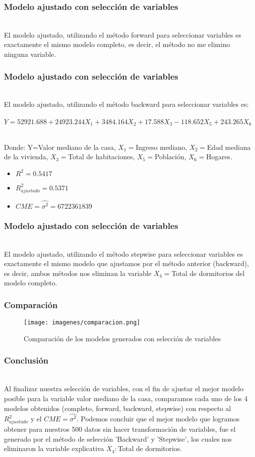 \documentclass[12pt]{beamer}
\begin{document}
\begin{frame}
\frametitle{Modelo ajustado con selección de variables}
~\\ El modelo ajustado, utilizando el método forward para seleccionar variables es exactamente el mismo modelo completo, es decir, el método no me elimino ninguna variable.
\end{frame}

\begin{frame}
\frametitle{Modelo ajustado con selección de variables}
~\\ El modelo ajustado, utilizando el método backward para seleccionar variables es:
~\\ $Y=52921.688+24923.244X_{1}+3484.164X_{2}+17.588X_{3}-118.652X_{5}+243.265X_{6}$

~\\ Donde: Y=Valor mediano de la casa, $X_{1}=$Ingreso mediano, $X_{2}=$Edad mediana de la vivienda, $X_{3}=$Total de habitaciones, $X_{5}=$Población, $X_{6}=$Hogares.
\begin{itemize}
\item $R^2=0.5417$
\item $R^2_{ajustado}=0.5371$
\item $CME=\hat{\sigma^2}=6722361839$
\end{itemize}
\end{frame}

\begin{frame}
\frametitle{Modelo ajustado con selección de variables}
~\\ El modelo ajustado, utilizando el método stepwise para seleccionar variables es  exactamente el mismo modelo que ajustamos por el método anterior (backward), es decir, ambos métodos nos eliminan la variable $X_{4}=$Total de dormitorios del modelo completo.
\end{frame}

\begin{frame}
\frametitle{Comparación}
\begin{figure}[!h]
    \begin{center}
        \texttt{[image: imagenes/comparacion.png]}
        \caption{Comparación de los modelos generados con selección de variables}
        \label{fig:Densidad}
    \end{center}
\end{figure}
\end{frame}

\begin{frame}
\frametitle{Conclusión}
~\\ Al finalizar nuestra selección de variables, con el fin de ajustar el mejor modelo posible para la variable valor mediano de la casa, comparamos cada uno de los 4 modelos obtenidos (completo, forward, backward, stepwise) con respecto al $R^2_{ajustado}$ y el $CME=\hat{\sigma^2}$. Podemos concluir que el mejor modelo que logramos obtener  para nuestros 500 datos sin hacer transformación de variables, fue el generado por el método de selección 'Backward'      y 'Stepwise', los cuales nos eliminaron la variable explicativa $X_{4}:$Total de dormitorios.
\end{frame}
\end{document}
